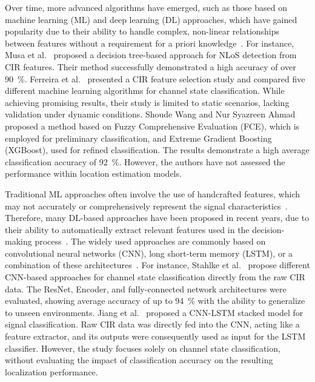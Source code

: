 Over time, more advanced algorithms have emerged, such as those based on machine learning (ML) and deep learning (DL) approaches, which have gained popularity due to their ability to handle complex, non-linear relationships between features without a requirement for a priori knowledge~\cite{yu2018novel, pei2024fcn}. For instance, Musa et al.~\cite{musa2019decision} proposed a decision tree-based approach for NLoS detection from CIR features. Their method successfully demonstrated a high accuracy of over \SI{90}{\percent}. Ferreira et al.~\cite{ferreira2021feature} presented a CIR feature selection study and compared five different machine learning algorithms for channel state classification. While achieving promising results, their study is limited to static scenarios, lacking validation under dynamic conditions. Shoude Wang and Nur Syazreen Ahmad~\cite{wang2024robust} proposed a method based on Fuzzy Comprehensive Evaluation (FCE), which is employed for preliminary classification, and Extreme Gradient Boosting (XGBoost), used for refined classification. The results demonstrate a high average classification accuracy of \SI{92}{\percent}. However, the authors have not assessed the performance within location estimation models.

Traditional ML approaches often involve the use of handcrafted features, which may not accurately or comprehensively represent the signal characteristics~\cite{abbasi2021novel}. Therefore, many DL-based approaches have been proposed in recent years, due to their ability to automatically extract relevant features used in the decision-making process~\cite{shaheen2016impact}. The widely used approaches are commonly based on convolutional neural networks (CNN), long short-term memory (LSTM), or a combination of these architectures~\cite{pei2024fcn}. For instance, Stahlke et al.~\cite{stahlke2020nlos} propose different CNN-based approaches for channel state classification directly from the raw CIR data. The ResNet, Encoder, and fully-connected network architectures were evaluated, showing average accuracy of up to \SI{94}{\percent} with the ability to generalize to unseen environments. Jiang et al.~\cite{jiang2020uwb} proposed a CNN-LSTM stacked model for signal classification. Raw CIR data was directly fed into the CNN, acting like a feature extractor, and its outputs were consequently used as input for the LSTM classifier. However, the study focuses solely on channel state classification, without evaluating the impact of classification accuracy on the resulting localization performance.

